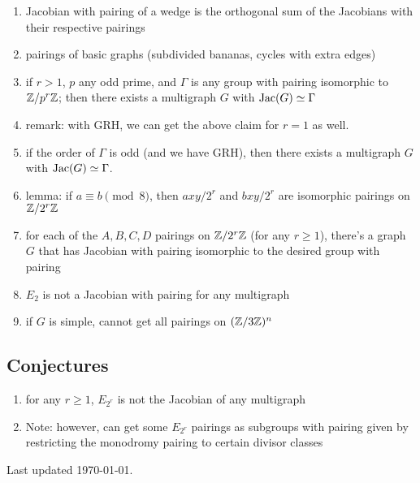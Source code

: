 \documentclass{amsart}
\begin{document}
\begin{enumerate}
\item Jacobian with pairing of a wedge is the orthogonal sum of the Jacobians with their respective pairings
\item pairings of basic graphs (subdivided bananas, cycles with extra edges)
\item if $r>1$, $p$ any odd prime, and $\Gamma$ is any group with pairing isomorphic to $\mathbb{Z}/p^r\mathbb{Z}$; then there exists a multigraph $G$ with $\operatorname{Jac}(G)\simeq \Gamma$
\item remark: with GRH, we can get the above claim for $r=1$ as well.
\item if the order of $\Gamma$ is odd (and we have GRH), then there exists a multigraph $G$ with $\operatorname{Jac}(G) \simeq \Gamma$.
\item lemma: if $a\equiv b\pmod 8$, then $axy/2^r$ and $bxy/2^r$ are isomorphic pairings on $\mathbb{Z}/2^r\mathbb{Z}$
\item for each of the $A,B,C,D$ pairings on $\mathbb{Z}/2^r\mathbb{Z}$ (for any $r\ge1$), there's a graph $G$ that has Jacobian with pairing isomorphic to the desired group with pairing
\item $E_2$ is not a Jacobian with pairing for any multigraph
\item if $G$ is simple, cannot get all pairings on $(\mathbb{Z}/3\mathbb{Z})^n$
\end{enumerate}

\subsection{Conjectures}

\begin{enumerate}
\item for any $r\ge1$, $E_{2^r}$ is not the Jacobian of any multigraph
\item Note: however, can get some $E_{2^r}$ pairings as subgroups with pairing given by restricting the monodromy pairing to certain divisor classes
\end{enumerate}

\vspace{1cm}
Last updated \today.
\end{document}
